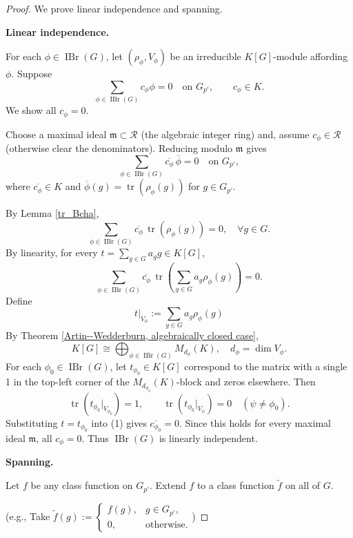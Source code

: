 \begin{proof}
We prove linear independence and spanning.

\medskip
\noindent\textbf{Linear independence.}

For each \(\phi \in \operatorname{IBr}(G)\), let \((\rho_\phi, V_\phi)\) be an irreducible \(K[G]\)-module affording \(\phi\). Suppose
\[
\sum_{\phi \in \operatorname{IBr}(G)} c_\phi \phi = 0 \quad \text{on } G_{p'}, \qquad c_\phi \in K.
\]
We show all \(c_\phi = 0\).

Choose a maximal ideal \(\mathfrak{m} \subset \mathcal{R}\) (the algebraic integer ring) and, assume \(c_\phi \in \mathcal{R}\) (otherwise clear the denominators). Reducing modulo \(\mathfrak{m}\) gives
\[
\sum_{\phi \in \operatorname{IBr}(G)} \overline{c_\phi} \, \overline{\phi} = 0 \quad \text{on } G_{p'},
\]
where \(\overline{c_\phi} \in K\) and \(\overline{\phi}(g) = \operatorname{tr}(\rho_\phi(g))\) for \(g \in G_{p'}\).

By Lemma \ref{tr_Bcha}, 
\[
\sum_{\phi \in \operatorname{IBr}(G)} \overline{c_\phi} \, \operatorname{tr}(\rho_\phi(g)) = 0, \quad \forall g \in G.
\]
By linearity, for every \(t =\sum_{g\in G}a_gg\in K[G]\),
\[
\sum_{\phi \in \operatorname{IBr}(G)} \overline{c_\phi} \, \operatorname{tr}(\sum_{g\in G}a_g\rho_\phi(g)) = 0. \tag{1}
\]
Define\[t|_{V_\phi}:=\sum_{g\in G}a_g\rho_\phi(g)\]
By Theorem \ref{Artin--Wedderburn, algebraically closed case},
\[
K[G] \cong \bigoplus_{\phi \in \operatorname{IBr}(G)} M_{d_\phi}(K), \quad d_\phi = \dim V_\phi.
\]
For each \(\phi_0 \in \operatorname{IBr}(G)\), let \(t_{\phi_0} \in K[G]\) correspond to the matrix with a single 1 in the top-left corner of the \(M_{d_{\phi_0}}(K)\)-block and zeros elsewhere. Then
\[
\operatorname{tr}(t_{\phi_0}|_{V_{\phi_0}}) = 1, \qquad \operatorname{tr}(t_{\phi_0}|_{V_\psi}) = 0 \quad (\psi \neq \phi_0).
\]
Substituting \(t = t_{\phi_0}\) into (1) gives \(\overline{c_{\phi_0}} = 0\). Since this holds for every maximal ideal \(\mathfrak{m}\), all \(c_\phi = 0\). Thus \(\operatorname{IBr}(G)\) is linearly independent.

\medskip
\noindent\textbf{Spanning.}

Let \(f\) be any class function on \(G_{p'}\). Extend \(f\) to a class function \(\tilde{f}\) on all of \(G\). 

(e.g., Take $\tilde{f}(g) :=
\begin{cases}
f(g), & g \in G_{p'},\\
0, &\text{otherwise}.
\end{cases}$)


\end{proof}

